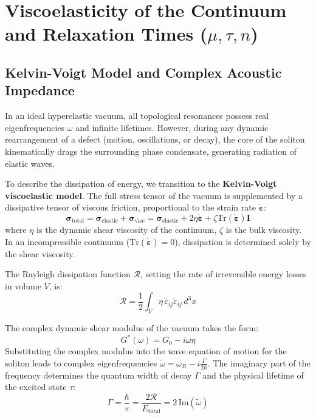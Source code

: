 \documentclass[12pt,a4paper]{article}
\begin{document}
		\section{Viscoelasticity of the Continuum and Relaxation Times ($\mu, \tau, n$)}
		
		\subsection{Kelvin-Voigt Model and Complex Acoustic Impedance}
		In an ideal hyperelastic vacuum, all topological resonances possess real eigenfrequencies $\omega$ and infinite lifetimes. However, during any dynamic rearrangement of a defect (motion, oscillations, or decay), the core of the soliton kinematically drags the surrounding phase condensate, generating radiation of elastic waves.
		
		To describe the dissipation of energy, we transition to the \textbf{Kelvin-Voigt viscoelastic model}. The full stress tensor of the vacuum is supplemented by a dissipative tensor of viscous friction, proportional to the strain rate $\dot{\boldsymbol{\varepsilon}}$:
		\begin{equation}
			\boldsymbol{\sigma}_{\text{total}} = \boldsymbol{\sigma}_{\text{elastic}} + \boldsymbol{\sigma}_{\text{visc}} = \boldsymbol{\sigma}_{\text{elastic}} + 2\eta \dot{\boldsymbol{\varepsilon}} + \zeta \text{Tr}(\dot{\boldsymbol{\varepsilon}}) \mathbf{I}
		\end{equation}
		where $\eta$ is the dynamic shear viscosity of the continuum, $\zeta$ is the bulk viscosity. In an incompressible continuum ($\text{Tr}(\dot{\boldsymbol{\varepsilon}}) = 0$), dissipation is determined solely by the shear viscosity.
		
		The Rayleigh dissipation function $\mathcal{R}$, setting the rate of irreversible energy losses in volume $V$, is:
		\begin{equation}
			\mathcal{R} = \frac{1}{2} \int_V \eta \, \dot{\varepsilon}_{ij} \dot{\varepsilon}_{ij} \, d^3x
		\end{equation}
		
		The complex dynamic shear modulus of the vacuum takes the form:
		\begin{equation}
			G^*(\omega) = G_0 - i \omega \eta
		\end{equation}
		Substituting the complex modulus into the wave equation of motion for the soliton leads to complex eigenfrequencies $\tilde{\omega} = \omega_R - i \frac{\Gamma}{2\hbar}$. The imaginary part of the frequency determines the quantum width of decay $\Gamma$ and the physical lifetime of the excited state $\tau$:
		\begin{equation}
			\Gamma = \frac{\hbar}{\tau} = \frac{2 \mathcal{R}}{E_{\text{total}}} = 2 \, \text{Im}(\tilde{\omega})
		\end{equation}
		
\end{document}
